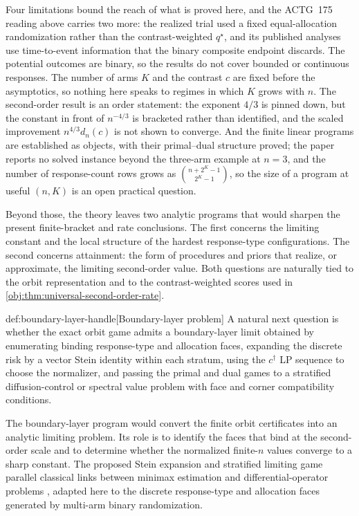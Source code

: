 Four limitations bound the reach of what is proved here, and the ACTG~175 reading above carries two more: the realized trial used a fixed equal-allocation randomization rather than the contrast-weighted \(q^\star\), and its published analyses use time-to-event information that the binary composite endpoint discards. The potential outcomes are binary, so the results do not cover bounded or continuous responses. The number of arms \(K\) and the contrast \(c\) are fixed before the asymptotics, so nothing here speaks to regimes in which \(K\) grows with \(n\). The second-order result is an order statement: the exponent \(4/3\) is pinned down, but the constant in front of \(n^{-4/3}\) is bracketed rather than identified, and the scaled improvement \(n^{4/3}d_n(c)\) is not shown to converge. And the finite linear programs are established as objects, with their primal--dual structure proved; the paper reports no solved instance beyond the three-arm example at \(n=3\), and the number of response-count rows grows as \(\binom{n+2^K-1}{2^K-1}\), so the size of a program at useful \((n,K)\) is an open practical question.

Beyond those, the theory leaves two analytic programs that would sharpen the present finite-bracket and rate conclusions. The first concerns the limiting constant and the local structure of the hardest response-type configurations. The second concerns attainment: the form of procedures and priors that realize, or approximate, the limiting second-order value. Both questions are naturally tied to the orbit representation and to the contrast-weighted scores used in \cref{obj:thm:universal-second-order-rate}.

\begin{remarkv}{def:boundary-layer-handle}[Boundary-layer problem]
A natural next question is whether the exact orbit game admits a boundary-layer limit obtained by enumerating binding response-type and allocation faces, expanding the discrete risk by a vector Stein identity within each stratum, using the \(c^\dagger\) LP sequence to choose the normalizer, and passing the primal and dual games to a stratified diffusion-control or spectral value problem with face and corner compatibility conditions.
\end{remarkv}

The boundary-layer program would convert the finite orbit certificates into an analytic limiting problem. Its role is to identify the faces that bind at the second-order scale and to determine whether the normalized finite-\(n\) values converge to a sharp constant. The proposed Stein expansion and stratified limiting game parallel classical links between minimax estimation and differential-operator problems \citep{levit_1986_schrodinger,johnstone_1992}, adapted here to the discrete response-type and allocation faces generated by multi-arm binary randomization.

